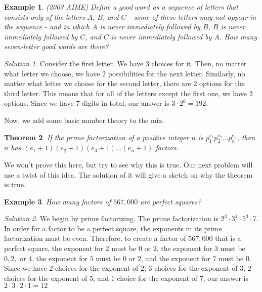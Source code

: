 \documentclass[letterpaper]{article}
\newtheorem{thm}{Theorem}[section]
\newtheorem{example}[thm]{Example}
\theoremstyle{remark}
\newtheorem*{solution}{Solution}
\theoremstyle{definition}
\begin{document}
\begin{example}
(2003 AIME) Define a $good~word$ as a sequence of letters that consists only of the letters $A$, $B$, and $C$ - some of these letters may not appear in the sequence - and in which $A$ is never immediately followed by $B$, $B$ is never immediately followed by $C$, and $C$ is never immediately followed by $A$. How many seven-letter good words are there?
\end{example}

\begin{solution}
Consider the first letter. We have $3$ choices for it. Then, no matter what letter we choose, we have $2$ possibilities for the next letter. Similarly, no matter what letter we choose for the second letter, there are $2$ options for the third letter. This means that for all of the letters except the first one, we have $2$ options. Since we have $7$ digits in total, our answer is $3\cdot 2^6=192.$
\end{solution}


Now, we add some basic number theory to the mix. 

\begin{thm}
If the prime factorization of a positive integer $n$ is $p_1^{e_1}p_2^{e_2} \dots p_n^{e_n}$, then $n$ has $(e_1+1)(e_2+1)(e_3+1)\dots (e_n+1)$ factors.

\end{thm}

We won't prove this here, but try to see why this is true. Our next problem will use a twist of this idea. The solution of it will give a sketch on why the theorem is true.
\begin{example}
How many factors of $567,000$ are perfect squares?
\end{example}

\begin{solution}
We begin by prime factorizing. The prime factorization is $2^3\cdot 3^4 \cdot 5^3 \cdot 7$. In order for a factor to be a perfect square, the exponents in its prime factorization must be even. Therefore, to create a factor of $567,000$ that is a perfect square, the exponent for $2$ must be $0$ or $2$, the exponent for $3$ must be $0,2,$ or $4$, the exponent for $5$ must be $0$ or $2$, and the exponent for $7$ must be $0$. Since we have $2$ choices for the exponent of $2$, $3$ choices for the exponent of $3$, $2$ choices for the exponent of $5$, and $1$ choice for the exponent of $7$, our answer is $2\cdot 3\cdot 2 \cdot 1=12$
\end{solution}
\end{document}
